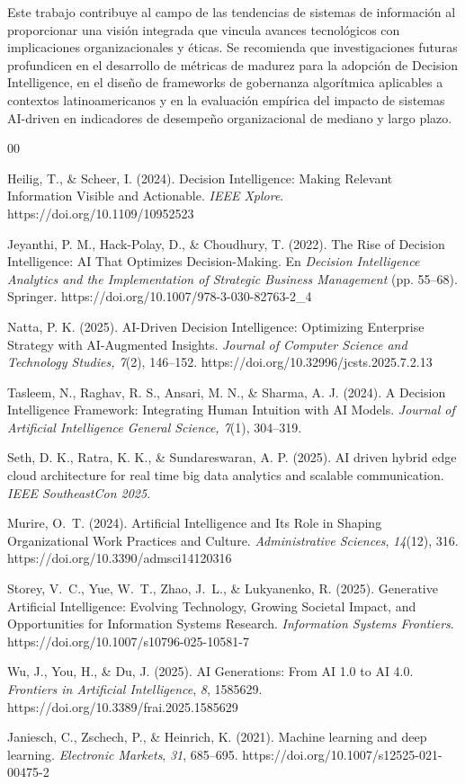 \documentclass[conference]{IEEEtran}
\begin{document}
Este trabajo contribuye al campo de las tendencias de sistemas de información al proporcionar una visión integrada que vincula avances tecnológicos con implicaciones organizacionales y éticas. Se recomienda que investigaciones futuras profundicen en el desarrollo de métricas de madurez para la adopción de Decision Intelligence, en el diseño de frameworks de gobernanza algorítmica aplicables a contextos latinoamericanos y en la evaluación empírica del impacto de sistemas AI-driven en indicadores de desempeño organizacional de mediano y largo plazo.

\begin{thebibliography}{00}

 Heilig, T., \& Scheer, I. (2024). Decision Intelligence: Making Relevant Information Visible and Actionable. \textit{IEEE Xplore}. https://doi.org/10.1109/10952523

 Jeyanthi, P. M., Hack-Polay, D., \& Choudhury, T. (2022). The Rise of Decision Intelligence: AI That Optimizes Decision-Making. En \textit{Decision Intelligence Analytics and the Implementation of Strategic Business Management} (pp. 55--68). Springer. https://doi.org/10.1007/978-3-030-82763-2\_4

 Natta, P. K. (2025). AI-Driven Decision Intelligence: Optimizing Enterprise Strategy with AI-Augmented Insights. \textit{Journal of Computer Science and Technology Studies, 7}(2), 146--152. https://doi.org/10.32996/jcsts.2025.7.2.13

 Tasleem, N., Raghav, R. S., Ansari, M. N., \& Sharma, A. J. (2024). A Decision Intelligence Framework: Integrating Human Intuition with AI Models. \textit{Journal of Artificial Intelligence General Science, 7}(1), 304--319. 

 Seth, D. K., Ratra, K. K., \& Sundareswaran, A. P. (2025). AI driven hybrid edge cloud architecture for real time big data analytics and scalable communication. \textit{IEEE SoutheastCon 2025}. 

 Murire, O.~T. (2024). Artificial Intelligence and Its Role in Shaping Organizational Work Practices and Culture. \textit{Administrative Sciences}, \textit{14}(12), 316. https://doi.org/10.3390/admsci14120316

 Storey, V.~C., Yue, W.~T., Zhao, J.~L., \& Lukyanenko, R. (2025). Generative Artificial Intelligence: Evolving Technology, Growing Societal Impact, and Opportunities for Information Systems Research. \textit{Information Systems Frontiers}. https://doi.org/10.1007/s10796-025-10581-7

 Wu, J., You, H., \& Du, J. (2025). AI Generations: From AI 1.0 to AI 4.0. \textit{Frontiers in Artificial Intelligence}, \textit{8}, 1585629. https://doi.org/10.3389/frai.2025.1585629

 Janiesch, C., Zschech, P., \& Heinrich, K. (2021). Machine learning and deep learning. \textit{Electronic Markets}, \textit{31}, 685--695. https://doi.org/10.1007/s12525-021-00475-2

\end{thebibliography}
\end{document}
